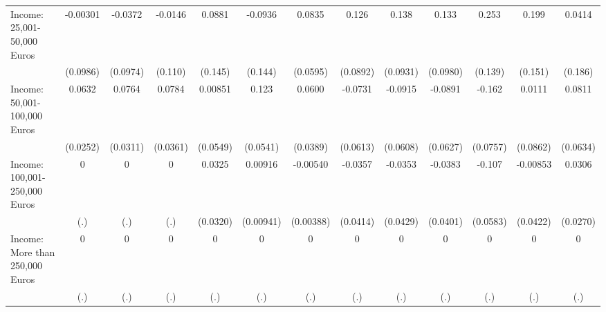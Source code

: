 {\begin{tabular}{l*{12}{c}}
\addlinespace
Income: 25,001-50,000 Euros&    -0.00301         &     -0.0372         &     -0.0146         &      0.0881         &     -0.0936         &      0.0835         &       0.126         &       0.138         &       0.133         &       0.253         &       0.199         &      0.0414         \\
            &    (0.0986)         &    (0.0974)         &     (0.110)         &     (0.145)         &     (0.144)         &    (0.0595)         &    (0.0892)         &    (0.0931)         &    (0.0980)         &     (0.139)         &     (0.151)         &     (0.186)         \\
\addlinespace
Income: 50,001-100,000 Euros&      0.0632\sym{*}  &      0.0764\sym{*}  &      0.0784\sym{*}  &     0.00851         &       0.123\sym{*}  &      0.0600         &     -0.0731         &     -0.0915         &     -0.0891         &      -0.162\sym{*}  &      0.0111         &      0.0811         \\
            &    (0.0252)         &    (0.0311)         &    (0.0361)         &    (0.0549)         &    (0.0541)         &    (0.0389)         &    (0.0613)         &    (0.0608)         &    (0.0627)         &    (0.0757)         &    (0.0862)         &    (0.0634)         \\
\addlinespace
Income: 100,001-250,000 Euros&           0         &           0         &           0         &      0.0325         &     0.00916         &    -0.00540         &     -0.0357         &     -0.0353         &     -0.0383         &      -0.107         &    -0.00853         &      0.0306         \\
            &         (.)         &         (.)         &         (.)         &    (0.0320)         &   (0.00941)         &   (0.00388)         &    (0.0414)         &    (0.0429)         &    (0.0401)         &    (0.0583)         &    (0.0422)         &    (0.0270)         \\
\addlinespace
Income: More than 250,000 Euros&           0         &           0         &           0         &           0         &           0         &           0         &           0         &           0         &           0         &           0         &           0         &           0         \\
            &         (.)         &         (.)         &         (.)         &         (.)         &         (.)         &         (.)         &         (.)         &         (.)         &         (.)         &         (.)         &         (.)         &         (.)         \\
\bottomrule
\end{tabular}
}
